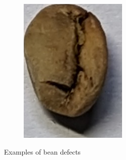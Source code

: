 \begin{figure}[h]
\begin{subfigure}
{            ./figures/methodology/mold-damaged-bean
        }
         \label{fig:moldBeanSingle}
    \end{subfigure}
    \begin{subfigure}
    {0.25\textwidth}
        \includegraphics[height=0.8\linewidth, keepaspectratio]{
            ./figures/methodology/under-bean
        }
         \label{fig:underBeanSingle}
    \end{subfigure}
    \caption{Examples of bean defects}
    \label{fig:beanDefects}
\end{figure}

